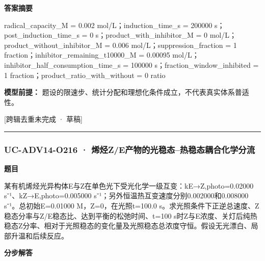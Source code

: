 \documentclass[UTF8,11pt,a4paper]{ctexart}
\begin{document}
\noindent\textbf{答案摘要}\par
radical\_capacity\_M = 0.002 mol/L；induction\_time\_s = 200000 s；post\_induction\_time\_s = 0 s；product\_with\_inhibitor\_M = 0 mol/L；product\_without\_inhibitor\_M = 0.006 mol/L；suppression\_fraction = 1 fraction；inhibitor\_remaining\_t10000\_M = 0.00095 mol/L；inhibitor\_half\_consumption\_time\_s = 100000 s；fraction\_window\_inhibited = 1 fraction；product\_ratio\_with\_without = 0 ratio\par
\noindent\textbf{模型前提：}
题设的限速步、统计分配和理想化条件成立，不代表真实体系普适性。\par
\noindent\textcolor{red!65!black}{[跨辑去重未完成 · 草稿]} \par
\medskip\hrule\medskip
{}
\subsubsection*{UC-ADV14-O216 · 烯烃Z/E产物的光稳态–热稳态耦合化学分流}
\noindent\textbf{题目}\par
某有机烯烃光异构体E与Z在单色光下受光化学一级互变：kE→Z,photo=0.02000 s⁻¹、kZ→E,photo=0.005000 s⁻¹；另外恒温热互变速度分别0.002000和0.008000 s⁻¹。总初始E=0.01000 M，Z=0，在光照t=100.0 s。求光照条件下正逆总速度、Z稳态分率与Z/E稳态比、达到平衡的松弛时间、t=100 s时Z与E浓度、关灯后纯热稳态Z分率、相对于光照稳态的变化量及光照稳态总浓度守恒。假设无光漂白、局部升温和后续反应。\par
\medskip\noindent\textbf{分步解答}
\end{document}
